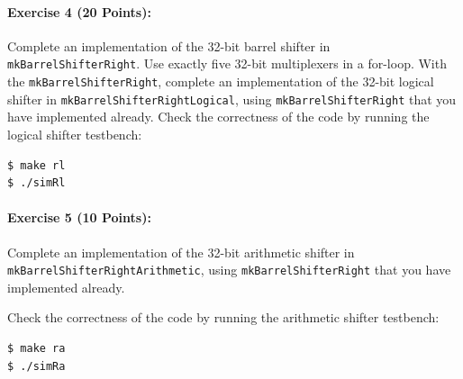\documentclass{article}
\begin{document}
\sloppy
\noindent \paragraph{\bf Exercise 4 (20 Points):}
Complete an implementation of the 32-bit barrel shifter in
\texttt{mkBarrelShifterRight}. Use exactly five 32-bit multiplexers in a
for-loop.
With the \texttt{mkBarrelShifterRight}, complete an implementation of the 32-bit logical shifter in
\verb|mkBarrelShifterRightLogical|, using \verb|mkBarrelShifterRight| that you
have implemented already.
Check the correctness of the code by running the logical shifter testbench:

\begin{verbatim}
$ make rl
$ ./simRl
\end{verbatim}

\sloppy
\noindent \paragraph{\bf Exercise 5 (10 Points):} Complete an implementation of
the 32-bit arithmetic shifter in \verb|mkBarrelShifterRightArithmetic|, using \verb|mkBarrelShifterRight| that you
have implemented already.

Check the correctness of the code by running the arithmetic shifter testbench:

\begin{verbatim}
$ make ra
$ ./simRa
\end{verbatim}
\end{document}
